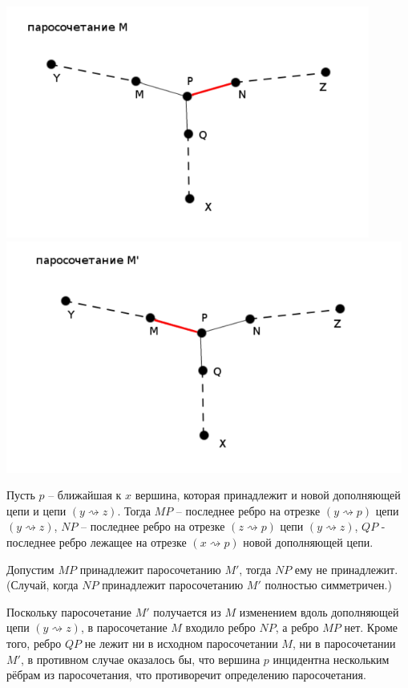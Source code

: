         \includegraphics[scale=1]{images/63-71_Kuhn2}
        \includegraphics[scale=1]{images/63-71_Kuhn1}
        
        Пусть $p$ – ближайшая к $x$ вершина, которая принадлежит и новой дополняющей цепи и цепи $(y \rightsquigarrow z)$.
        Тогда $MP$ – последнее ребро на отрезке $(y \rightsquigarrow p)$ цепи $(y \rightsquigarrow z)$, $NP$ – последнее ребро на отрезке $(z \rightsquigarrow p)$ цепи $(y \rightsquigarrow z)$, $QP$ - последнее ребро лежащее на отрезке $(x \rightsquigarrow p)$ новой дополняющей цепи.
        
        Допустим $MP$ принадлежит паросочетанию $M'$, тогда $NP$ ему не принадлежит.
        (Случай, когда $NP$ принадлежит паросочетанию $M'$ полностью симметричен.)
        
        Поскольку паросочетание $M'$ получается из $M$ изменением вдоль дополняющей цепи $(y \rightsquigarrow z)$, в паросочетание $M$ входило ребро $NP$, а ребро $MP$ нет.
        Кроме того, ребро $QP$ не лежит ни в исходном паросочетании $M$, ни в паросочетании $M'$, в противном случае оказалось бы, что вершина $p$ инцидентна нескольким рёбрам из паросочетания, что противоречит определению паросочетания.
        

